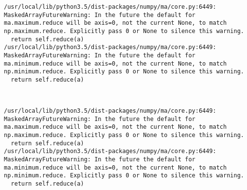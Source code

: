 \documentclass[11pt]{article}
\begin{document}
    \begin{Verbatim}[commandchars=\\\{\}]
/usr/local/lib/python3.5/dist-packages/numpy/ma/core.py:6449: MaskedArrayFutureWarning: In the future the default for ma.maximum.reduce will be axis=0, not the current None, to match np.maximum.reduce. Explicitly pass 0 or None to silence this warning.
  return self.reduce(a)
/usr/local/lib/python3.5/dist-packages/numpy/ma/core.py:6449: MaskedArrayFutureWarning: In the future the default for ma.minimum.reduce will be axis=0, not the current None, to match np.minimum.reduce. Explicitly pass 0 or None to silence this warning.
  return self.reduce(a)

    \end{Verbatim}

    \begin{center}
    \end{center}
    { \hspace*{\fill} \\}
    
    \begin{Verbatim}[commandchars=\\\{\}]
/usr/local/lib/python3.5/dist-packages/numpy/ma/core.py:6449: MaskedArrayFutureWarning: In the future the default for ma.maximum.reduce will be axis=0, not the current None, to match np.maximum.reduce. Explicitly pass 0 or None to silence this warning.
  return self.reduce(a)
/usr/local/lib/python3.5/dist-packages/numpy/ma/core.py:6449: MaskedArrayFutureWarning: In the future the default for ma.minimum.reduce will be axis=0, not the current None, to match np.minimum.reduce. Explicitly pass 0 or None to silence this warning.
  return self.reduce(a)

    \end{Verbatim}

    \begin{center}
    \end{center}
    { \hspace*{\fill} \\}
    
\end{document}
